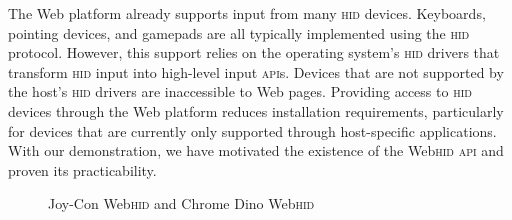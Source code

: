 \documentclass[sigconf]{acmart}
\begin{document}
The Web platform already supports input from many \textsc{hid} devices.
Keyboards, pointing devices, and gamepads are all typically implemented
using the \textsc{hid} protocol.
However, this support relies on the operating system's \textsc{hid} drivers
that transform \textsc{hid} input into high-level input \textsc{api}s.
Devices that are not supported by the host's \textsc{hid} drivers are
inaccessible to Web pages.
Providing access to \textsc{hid} devices through the Web platform
reduces installation requirements, particularly for devices that are
currently only supported through host-specific applications.
With our demonstration, we have motivated the existence of 
the Web\textsc{hid} \textsc{api} and proven its practicability.

\begin{figure}
  \centering
  \label{fig:double}
  \caption{Joy-Con Web\textsc{hid} and Chrome Dino Web\textsc{hid}}
\end{figure}



\end{document}

